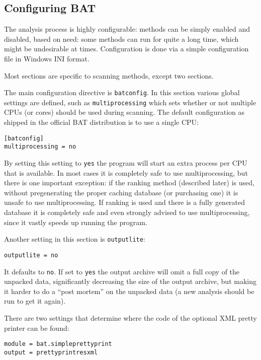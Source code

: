 \documentclass[10pt]{article}
\begin{document}
\subsection{Configuring BAT}

The analysis process is highly configurable: methods can be simply enabled and
disabled, based on need: some methods can run for quite a long time, which
might be undesirable at times. Configuration is done via a simple configuration
file in Windows INI format.

Most sections are specific to scanning methods, except two sections.

The main configuration directive is \texttt{batconfig}. In this
section various global settings are defined, such as \texttt{multiprocessing}
which sets whether or not multiple CPUs (or cores) should be used during
scanning. The default configuration as shipped in the official BAT distribution
is to use a single CPU:

\begin{verbatim}
[batconfig]
multiprocessing = no
\end{verbatim}

By setting this setting to \texttt{yes} the program will start an extra process
per CPU that is available. In most cases it is completely safe to use
multiprocessing, but there is one important exception: if the ranking method
(described later) is used, without pregenerating the proper caching database
(or purchasing one) it is unsafe to use multiprocessing. If ranking is used and
there is a fully generated database it is completely safe and even strongly
advised to use multiprocessing, since it vastly speeds up running the program.

Another setting in this section is \texttt{outputlite}:

\begin{verbatim}
outputlite = no
\end{verbatim}

It defaults to \texttt{no}. If set to \texttt{yes} the output archive will omit
a full copy of the unpacked data, significantly decreasing the size of the
output archive, but making it harder to do a ``post mortem'' on the unpacked
data (a new analysis should be run to get it again).

There are two settings that determine where the code of the optional XML pretty
printer can be found:

\begin{verbatim}
module = bat.simpleprettyprint
output = prettyprintresxml
\end{verbatim}
\end{document}
